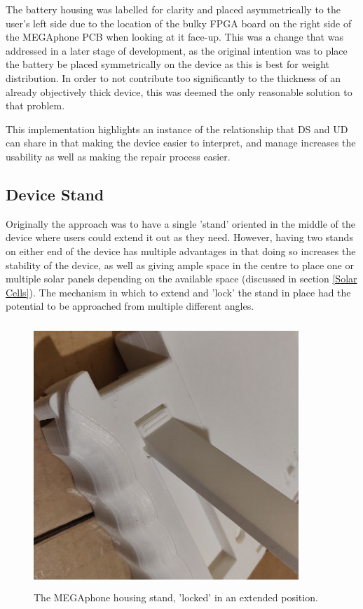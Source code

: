 The battery housing was labelled for clarity and placed asymmetrically to the user's left side due to the location of the bulky FPGA board on the right side of the MEGAphone PCB when looking at it face-up.
This was a change that was addressed in a later stage of development, as the original intention was to place the battery be placed symmetrically on the device as this is best for weight distribution.
In order to not contribute too significantly to the thickness of an already objectively thick device, this was deemed the only reasonable solution to that problem.

This implementation highlights an instance of the relationship that DS and UD can share in that making the device easier to interpret, and manage increases the usability as well as making the repair process easier.

\subsection{Device Stand} \label{Stand}

Originally the approach was to have a single 'stand' oriented in the middle of the device where users could extend it out as they need.
However, having two stands on either end of the device has multiple advantages in that doing so increases the stability of the device, as well as giving ample space in the centre to place one or multiple solar panels depending on the available space (discussed in section \ref{Solar Cells}).
The mechanism in which to extend and 'lock' the stand in place had the potential to be approached from multiple different angles.

\begin{figure} [h]
    \centering
    \includegraphics[width=10cm,height=10cm,keepaspectratio]{Figures/stand_housing.png}
    \caption{The MEGAphone housing stand, 'locked' in an extended position.}
    \label{fig:Stand}
\end{figure}

